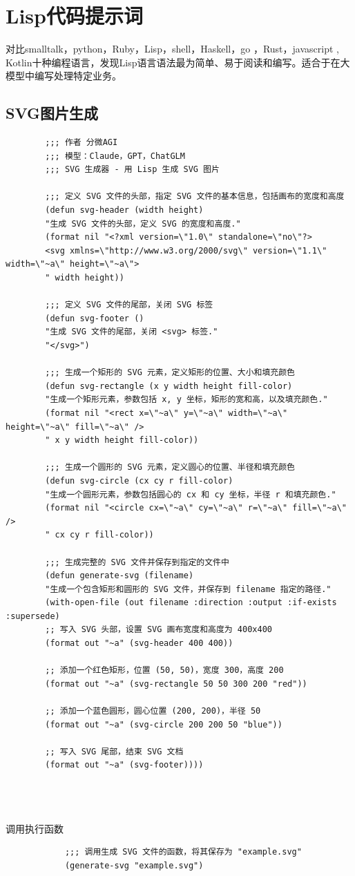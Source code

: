 \documentclass[12pt]{book}
\begin{document}
\section{Lisp代码提示词}
对比smalltalk，python，Ruby，Lisp，shell，Haskell，go ，Rust，javascript , Kotlin十种编程语言，发现Lisp语言语法最为简单、易于阅读和编写。适合于在大模型中编写处理特定业务。

\subsection{SVG图片生成}
	\begin{lstlisting}
		;;; 作者 分微AGI
		;;; 模型：Claude，GPT，ChatGLM
		;;; SVG 生成器 - 用 Lisp 生成 SVG 图片
		
		;;; 定义 SVG 文件的头部，指定 SVG 文件的基本信息，包括画布的宽度和高度
		(defun svg-header (width height)
		"生成 SVG 文件的头部，定义 SVG 的宽度和高度."
		(format nil "<?xml version=\"1.0\" standalone=\"no\"?>
		<svg xmlns=\"http://www.w3.org/2000/svg\" version=\"1.1\" width=\"~a\" height=\"~a\">
		" width height))
		
		;;; 定义 SVG 文件的尾部，关闭 SVG 标签
		(defun svg-footer ()
		"生成 SVG 文件的尾部，关闭 <svg> 标签."
		"</svg>")
		
		;;; 生成一个矩形的 SVG 元素，定义矩形的位置、大小和填充颜色
		(defun svg-rectangle (x y width height fill-color)
		"生成一个矩形元素，参数包括 x, y 坐标，矩形的宽和高，以及填充颜色."
		(format nil "<rect x=\"~a\" y=\"~a\" width=\"~a\" height=\"~a\" fill=\"~a\" />
		" x y width height fill-color))
		
		;;; 生成一个圆形的 SVG 元素，定义圆心的位置、半径和填充颜色
		(defun svg-circle (cx cy r fill-color)
		"生成一个圆形元素，参数包括圆心的 cx 和 cy 坐标，半径 r 和填充颜色."
		(format nil "<circle cx=\"~a\" cy=\"~a\" r=\"~a\" fill=\"~a\" />
		" cx cy r fill-color))
		
		;;; 生成完整的 SVG 文件并保存到指定的文件中
		(defun generate-svg (filename)
		"生成一个包含矩形和圆形的 SVG 文件，并保存到 filename 指定的路径."
		(with-open-file (out filename :direction :output :if-exists :supersede)
		;; 写入 SVG 头部，设置 SVG 画布宽度和高度为 400x400
		(format out "~a" (svg-header 400 400))
		
		;; 添加一个红色矩形，位置 (50, 50)，宽度 300，高度 200
		(format out "~a" (svg-rectangle 50 50 300 200 "red"))
		
		;; 添加一个蓝色圆形，圆心位置 (200, 200)，半径 50
		(format out "~a" (svg-circle 200 200 50 "blue"))
		
		;; 写入 SVG 尾部，结束 SVG 文档
		(format out "~a" (svg-footer))))
		

		
	\end{lstlisting}
		调用执行函数
		\begin{lstlisting}
			;;; 调用生成 SVG 文件的函数，将其保存为 "example.svg"
			(generate-svg "example.svg")
		\end{lstlisting}
		
\end{document}
